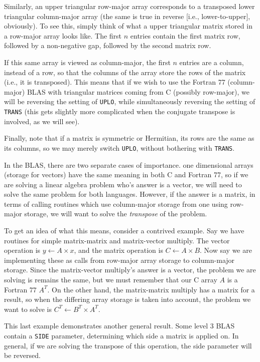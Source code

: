 \documentclass{article}
\begin{document}
Similarly, an upper triangular row-major array corresponds to a transposed
lower triangular column-major array (the same is true in reverse [i.e.,
lower-to-upper], obviously).  To see this, simply think of what a upper
triangular matrix stored in a row-major array looks like.  The first $n$
entries contain the first matrix row, followed by a non-negative gap, 
followed by the second matrix row.

If this same array is viewed as column-major, the first $n$ entries are a
column, instead of a row, so that the columns of the array store the
rows of the matrix (i.e., it is transposed).  This means that if we wish
to use the Fortran 77 (column-major) BLAS with triangular matrices coming
from C (possibly row-major), we will be reversing the setting of {\tt UPLO},
while simultaneously reversing the setting of {\tt TRANS} (this gets slightly
more complicated when the conjugate transpose is involved, as we will see).

Finally, note that if a matrix is symmetric or Hermitian, its rows are the
same as its columns, so we may merely switch {\tt UPLO}, without bothering with
{\tt TRANS}.

In the BLAS, there are two separate cases of importance.  one dimensional
arrays (storage for vectors) have the same meaning in both C and Fortran 77,
so if we are
solving a linear algebra problem who's answer is a vector, we will need to
solve the same problem for both languages.  However, if the answer is a
matrix, in terms of calling routines which use column-major storage from
one using row-major storage, we will want to solve the {\em transpose}
of the problem.

To get an idea of what this means, consider a contrived example.  Say we
have routines for simple matrix-matrix and matrix-vector multiply.  The vector
operation is $y \leftarrow A \times x$, and the matrix operation is
$C \leftarrow A \times B$.  Now say we are implementing these as calls
from row-major array storage to column-major storage.  Since the matrix-vector
multiply's answer is a vector, the problem we are solving is remains the same,
but we must remember that our C array $A$ is a Fortran 77 $A^T$.
On the other hand, the matrix-matrix multiply has a matrix
for a result, so when the differing array storage is taken into account,
the problem we want to solve is $C^T \leftarrow B^T \times A^T$.

This last example demonstrates another general result.  Some level 3 BLAS
contain a {\tt SIDE} parameter, determining which side a matrix is applied
on.  In general, if we are solving the transpose of this operation, the side
parameter will be reversed.
\end{document}
